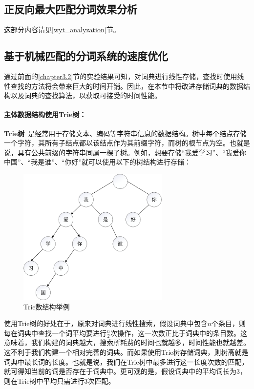 \documentclass[11pt,a4paper]{article}
\begin{document}
	\subsection{正反向最大匹配分词效果分析}
	\noindent
	这部分内容请见\ref{wyt_analyzation}节。
	
	\subsection{基于机械匹配的分词系统的速度优化}\label{chapter3.4}
	\noindent
	通过前面的\ref{chapter3.2}节的实验结果可知，对词典进行线性存储，查找时使用线性查找的方法将会带来巨大的时间开销。因此，在本节中将改进存储词典的数据结构以及词典的查找算法，以获取可接受的时间性能。
	
	\paragraph{主体数据结构使用Trie树：}{\bfseries Trie树}~\citep{thue1912uber}是经常用于存储文本、编码等字符串信息的数据结构。树中每个结点存储一个字符，其所有子结点都以该结点作为其前缀字符，而树的根节点为空。也就是说，具有公共前缀的字符串同属一棵子树。例如，想要存储“我爱学习”、“我爱你中国”、“我是谁”、“你好”就可以使用以下的树结构进行存储：
	\begin{figure}[htbp]
		\centering
		\includegraphics[width=7.5cm]{trie.png}
		\caption{Trie数结构举例}\label{trie}
	\end{figure}
	
	使用Trie树的好处在于，原来对词典进行线性搜索，假设词典中包含$n$个条目，则每在词典中查找一个词平均要进行$\frac{n}{2}$次操作，这一次数正比于词典中的条目数。这意味着，我们构建的词典越大，搜索所耗费的时间也就越多，时间性能也就越差。这不利于我们构建一个相对完善的词典。而如果使用Trie树存储词典，则树高就是词典中最长词的长度。也就是说，我们在Trie树中最多进行这一长度次数的匹配，就可得知当前的词是否存在于词典中。更可观的是，假设词典中的平均词长为3，则在Trie树中平均只需进行3次匹配。
	
\end{document}
